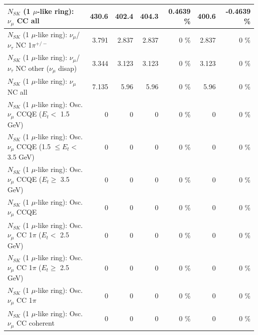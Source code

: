 \begin{table}
\begin{tabular}{| l | r | r | r  r | r  r |}
                                $N_{SK}$ (1 $\mu$-like ring): $\nu_{\mu}$ CC all &           430.6 &           402.4 &           404.3 &   0.4639 \%  &           400.6 &  -0.4639 \%  \\ 
\hline
              $N_{SK}$ (1 $\mu$-like ring): $\nu_\mu$/$\nu_\tau$ NC 1$\pi^{+/-}$ &           3.791 &           2.837 &           2.837 &        0 \%  &           2.837 &        0 \%  \\ 
   $N_{SK}$ (1 $\mu$-like ring): $\nu_\mu$/$\nu_\tau$ NC other ($\nu_\mu$ disap) &           3.344 &           3.123 &           3.123 &        0 \%  &           3.123 &        0 \%  \\ 
                                $N_{SK}$ (1 $\mu$-like ring): $\nu_{\mu}$ NC all &           7.135 &            5.96 &            5.96 &        0 \%  &            5.96 &        0 \%  \\ 
\hline
\hline
           $N_{SK}$ (1 $\mu$-like ring): Osc. $\nu_\mu$ CCQE ($E_{t} <$ 1.5 GeV) &               0 &               0 &               0 &        0 \%  &               0 &        0 \%  \\ 
  $N_{SK}$ (1 $\mu$-like ring): Osc. $\nu_\mu$ CCQE (1.5 $\leq E_{t} <$ 3.5 GeV) &               0 &               0 &               0 &        0 \%  &               0 &        0 \%  \\ 
        $N_{SK}$ (1 $\mu$-like ring): Osc. $\nu_\mu$ CCQE ($E_{t} \geq$ 3.5 GeV) &               0 &               0 &               0 &        0 \%  &               0 &        0 \%  \\ 
\hline
                               $N_{SK}$ (1 $\mu$-like ring): Osc. $\nu_\mu$ CCQE &               0 &               0 &               0 &        0 \%  &               0 &        0 \%  \\ 
\hline
      $N_{SK}$ (1 $\mu$-like ring): Osc. $\nu_\mu$ CC 1$\pi$ ($E_{t} <$ 2.5 GeV) &               0 &               0 &               0 &        0 \%  &               0 &        0 \%  \\ 
   $N_{SK}$ (1 $\mu$-like ring): Osc. $\nu_\mu$ CC 1$\pi$ ($E_{t} \geq$ 2.5 GeV) &               0 &               0 &               0 &        0 \%  &               0 &        0 \%  \\ 
\hline
                          $N_{SK}$ (1 $\mu$-like ring): Osc. $\nu_\mu$ CC 1$\pi$ &               0 &               0 &               0 &        0 \%  &               0 &        0 \%  \\ 
                        $N_{SK}$ (1 $\mu$-like ring): Osc. $\nu_\mu$ CC coherent &               0 &               0 &               0 &        0 \%  &               0 &        0 \%  \\ 

\end{tabular}
\end{table}
